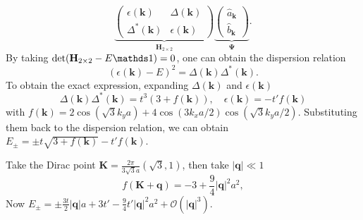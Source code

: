 \begin{solution}
\begin{enumext}
\[      \underbrace{\begin{pmatrix}
        \epsilon(\bm k) & \Delta(\bm k)\\
        \Delta^*(\bm k) & \epsilon(\bm k)
      \end{pmatrix}}_{\mathbf H_{2\times 2}}
      \underbrace{\begin{pmatrix}
        \hat a_{\bm k}\\
        \hat b_{\bm k}
      \end{pmatrix}}_{\mathbf\Psi}.
    \]
    By taking $\det(\mathbf H_{2\times2} - E\identity) = 0$, one can obtain the
    dispersion relation
    \[
      (\epsilon(\bm k) - E)^2 = \Delta(\bm k) \Delta^*(\bm k).
    \]
    To obtain the exact expression, expanding $\Delta(\bm k)$
    and $\epsilon(\bm k)$
    \[
      \Delta(\bm k) \Delta^*(\bm k) = t^3(3 + f(\bm k)),\quad
      \epsilon(\bm k) = -t'f(\bm k)
    \]
    with $f(\bm k) = 2\cos(\sqrt3k_ya)
    + 4\cos(3k_xa/2)\cos(\sqrt3k_ya/2)$.
    Substituting them back to the dispersion relation, we can obtain
    $E_\pm = \pm t\sqrt{3 + f(\bm k)} - t'f(\bm k)$.
    \item Take the Dirac point $\bm K = \frac{2\pi}{3\sqrt3a}(\sqrt3,1)$, then
    take $|\bm q| \ll 1$
    \[
      f(\bm K + \bm q) = -3 + \frac94|\bm q|^2a^2,
    \]
    Now $E_\pm = \pm\frac{3t}{2}|\bm q| a + 3t' - \frac94t'|\bm q|^2a^2
    + \mathcal O(|\bm q|^3).$
  \end{enumext}
\end{solution}

